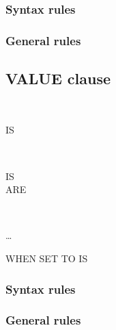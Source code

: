\subsubsection{Syntax rules}

\subsubsection{General rules}

\subsection{VALUE clause}
\begin{syntax}
  \begin{1=}
     \\
  \end{1=}
  \begin{0-1}
    IS \\
  \end{0-1}
  \literal
\end{syntax}

\begin{syntax}
  \begin{1=}
     \\
  \end{1=}
  \begin{0-1}
    IS \\
    ARE
  \end{0-1}
  \begin{1=}
    \literal
    \begin{0-1}
      \begin{1=}
         \\
      \end{1=}
      \literal
    \end{0-1}
  \end{1=} \ldots

  \begin{0-1}
    WHEN SET TO  IS \literal
  \end{0-1}
\end{syntax}

\subsubsection{Syntax rules}

\subsubsection{General rules}

